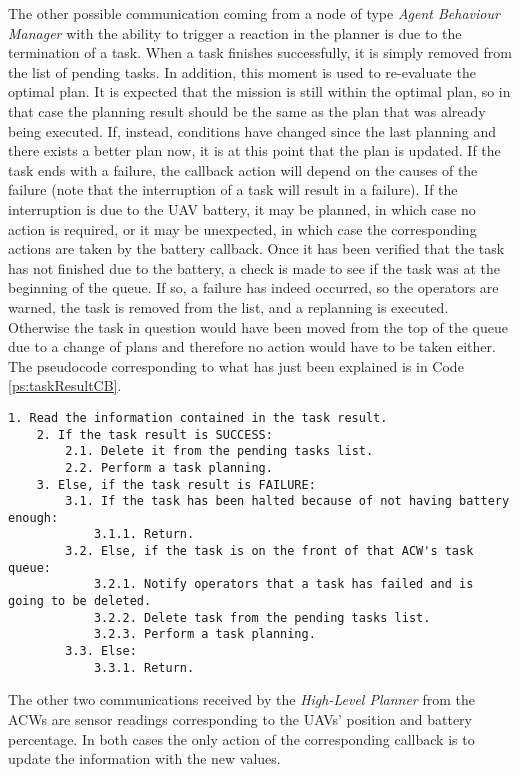 The other possible communication coming from a node of type \emph{Agent Behaviour Manager} with the ability to trigger a reaction in the planner is due to the termination of a task. When a task finishes successfully, it is simply removed from the list of pending tasks. In addition, this moment is used to re-evaluate the optimal plan. It is expected that the mission is still within the optimal plan, so in that case the planning result should be the same as the plan that was already being executed. If, instead, conditions have changed since the last planning and there exists a better plan now, it is at this point that the plan is updated. If the task ends with a failure, the callback action will depend on the causes of the failure (note that the interruption of a task will result in a failure). If the interruption is due to the \gls{UAV} battery, it may be planned, in which case no action is required, or it may be unexpected, in which case the corresponding actions are taken by the battery callback. Once it has been verified that the task has not finished due to the battery, a check is made to see if the task was at the beginning of the queue. If so, a failure has indeed occurred, so the operators are warned, the task is removed from the list, and a replanning is executed. Otherwise the task in question would have been moved from the top of the queue due to a change of plans and therefore no action would have to be taken either. The pseudocode corresponding to what has just been explained is in Code \ref{ps:taskResultCB}.

\begin{lstlisting}[caption={Callback that runs when an \emph{Agent Behaviour Manager} sends a task result}, breaklines=true, label=ps:taskResultCB]
	1. Read the information contained in the task result.
	2. If the task result is SUCCESS:
		2.1. Delete it from the pending tasks list.
		2.2. Perform a task planning.
	3. Else, if the task result is FAILURE:
		3.1. If the task has been halted because of not having battery enough:
			3.1.1. Return.
		3.2. Else, if the task is on the front of that ACW's task queue:
			3.2.1. Notify operators that a task has failed and is going to be deleted.
			3.2.2. Delete task from the pending tasks list.
			3.2.3. Perform a task planning.
		3.3. Else:
			3.3.1. Return.
\end{lstlisting}

The other two communications received by the \emph{High-Level Planner} from the \glspl{ACW} are sensor readings corresponding to the \glspl{UAV}' position and battery percentage. In both cases the only action of the corresponding callback is to update the information with the new values.

